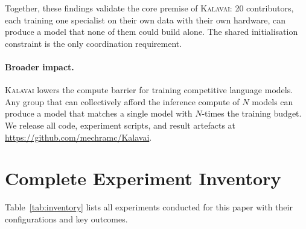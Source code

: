 \documentclass{article}
\newcommand{\kalavai}{\textsc{Kalavai}\xspace}
\begin{document}
Together, these findings validate the core premise of \kalavai: 20 contributors, each training one specialist on their own data with their own hardware, can produce a model that none of them could build alone. The shared initialisation constraint is the only coordination requirement.

\paragraph{Broader impact.} \kalavai lowers the compute barrier for training competitive language models. Any group that can collectively afford the inference compute of $N$ models can produce a model that matches a single model with $N$-times the training budget. We release all code, experiment scripts, and result artefacts at \url{https://github.com/mechramc/Kalavai}.





\appendix

\section{Complete Experiment Inventory}
\label{app:inventory}

Table~\ref{tab:inventory} lists all experiments conducted for this paper with their configurations and key outcomes.
\end{document}
